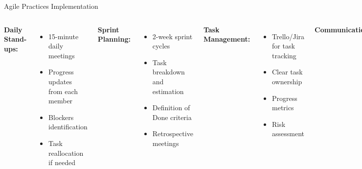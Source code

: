 \documentclass[aspectratio=169]{beamer}
\begin{document}
\begin{frame}{Agile Practices Implementation}
\begin{columns}
\textbf{Daily Stand-ups:}
\begin{itemize}
    \item 15-minute daily meetings
    \item Progress updates from each member
    \item Blockers identification
    \item Task reallocation if needed
\end{itemize}

\textbf{Sprint Planning:}
\begin{itemize}
    \item 2-week sprint cycles
    \item Task breakdown and estimation
    \item Definition of Done criteria
    \item Retrospective meetings
\end{itemize}

\textbf{Task Management:}
\begin{itemize}
    \item Trello/Jira for task tracking
    \item Clear task ownership
    \item Progress metrics
    \item Risk assessment
\end{itemize}

\textbf{Communication:}
\begin{itemize}
    \item Slack/Discord for daily communication
    \item Meeting protocols documentation
    \item Shared documentation repository
    \item Regular status reports
\end{itemize}
\end{columns}
\end{frame}
\end{document}
